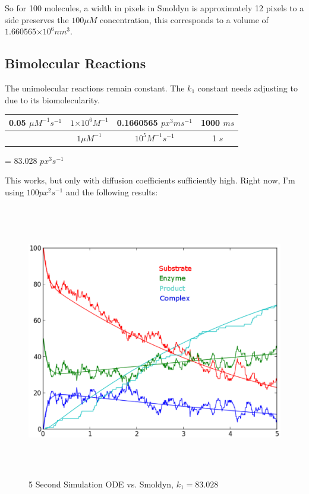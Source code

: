 \documentclass{article}
\providecommand{\e}[1]{\ensuremath{\times 10^{#1}}}
\begin{document}
So for 100 molecules, a width in pixels in Smoldyn is approximately 12 pixels to a side preserves the $100\mu M$ concentration, this corresponds to a volume of $1.660565\e{6} nm^3$.

\subsection{Bimolecular Reactions}

The unimolecular reactions remain constant. The $k_1$ constant needs adjusting to due to its biomolecularity. 

\begin{center}
\begin{tabular}{c|c|c|c}
0.05 $\mu M^{-1} s^{-1}$ &  $1\e{6} M^{-1}$ & 0.1660565 $px^3 ms^{-1 }$ & 1000 $ms$\\
\hline
 & $1 \mu M^{-1}$ & $10^5 M^{-1} s^{-1}$ & 1 $s$ \\
\end{tabular} = 83.028 $px^3 s^{-1}$ 
\end{center}

This works, but only with diffusion coefficients sufficiently high. Right now, I'm using $100 px^2 s^{-1}$ and the following results:

\begin{figure}[h]
\centering
\includegraphics[width=16cm, height=12cm]{figure_1.eps}
\caption{5 Second Simulation ODE vs. Smoldyn, $k_1=83.028$}
\label{fig1}
\end{figure}
\end{document}
